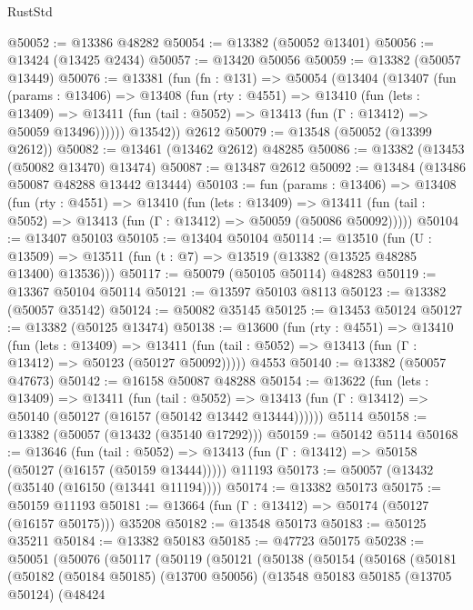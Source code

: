 \begin{lexlean}{RustStd}
\begin{coremodule}
@50052 := @13386 @48282
@50054 := @13382 (@50052 @13401)
@50056 := @13424 (@13425 @2434)
@50057 := @13420 @50056
@50059 := @13382 (@50057 @13449)
@50076 := @13381
    (fun (fn : @131) =>
    @50054
      (@13404
        (@13407
          (fun (params : @13406) =>
          @13408
            (fun (rty : @4551) =>
            @13410
              (fun (lets : @13409) =>
              @13411 (fun (tail : @5052) => @13413 (fun (Γ : @13412) => @50059 @13496))))))
        @13542))
    @2612
@50079 := @13548 (@50052 (@13399 @2612))
@50082 := @13461 (@13462 @2612) @48285
@50086 := @13382 (@13453 (@50082 @13470) @13474)
@50087 := @13487 @2612
@50092 := @13484 (@13486 @50087 @48288 @13442 @13444)
@50103 := fun (params : @13406) =>
  @13408
    (fun (rty : @4551) =>
    @13410
      (fun (lets : @13409) =>
      @13411 (fun (tail : @5052) => @13413 (fun (Γ : @13412) => @50059 (@50086 @50092)))))
@50104 := @13407 @50103
@50105 := @13404 @50104
@50114 := @13510
    (fun (U : @13509) => @13511 (fun (t : @7) => @13519 (@13382 (@13525 @48285 @13400) @13536)))
@50117 := @50079 (@50105 @50114) @48283
@50119 := @13367 @50104 @50114
@50121 := @13597 @50103 @8113
@50123 := @13382 (@50057 @35142)
@50124 := @50082 @35145
@50125 := @13453 @50124
@50127 := @13382 (@50125 @13474)
@50138 := @13600
    (fun (rty : @4551) =>
    @13410
      (fun (lets : @13409) =>
      @13411 (fun (tail : @5052) => @13413 (fun (Γ : @13412) => @50123 (@50127 @50092)))))
    @4553
@50140 := @13382 (@50057 @47673)
@50142 := @16158 @50087 @48288
@50154 := @13622
    (fun (lets : @13409) =>
    @13411
      (fun (tail : @5052) =>
      @13413 (fun (Γ : @13412) => @50140 (@50127 (@16157 (@50142 @13442 @13444))))))
    @5114
@50158 := @13382 (@50057 (@13432 (@35140 @17292)))
@50159 := @50142 @5114
@50168 := @13646
    (fun (tail : @5052) => @13413 (fun (Γ : @13412) => @50158 (@50127 (@16157 (@50159 @13444)))))
    @11193
@50173 := @50057 (@13432 (@35140 (@16150 (@13441 @11194))))
@50174 := @13382 @50173
@50175 := @50159 @11193
@50181 := @13664 (fun (Γ : @13412) => @50174 (@50127 (@16157 @50175))) @35208
@50182 := @13548 @50173
@50183 := @50125 @35211
@50184 := @13382 @50183
@50185 := @47723 @50175
@50238 := @50051
    (@50076
      (@50117
        (@50119
          (@50121
            (@50138
              (@50154
                (@50168
                  (@50181
                    (@50182
                      (@50184 @50185)
                      (@13700 @50056)
                      (@13548
                        @50183
                        @50185
                        (@13705 @50124)
                        (@48424

\end{coremodule}
\end{lexlean}
